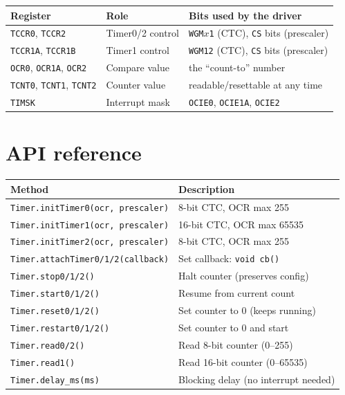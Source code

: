 \documentclass[11pt,a4paper]{article}
\begin{document}
\begin{center}
\small
\begin{tabular}{lll}
\toprule
\textbf{Register} & \textbf{Role} & \textbf{Bits used by the driver} \\
\midrule
\texttt{TCCR0}, \texttt{TCCR2}   & Timer0/2 control & \texttt{WGM$x$1} (CTC), \texttt{CS} bits (prescaler) \\
\texttt{TCCR1A}, \texttt{TCCR1B} & Timer1 control   & \texttt{WGM12} (CTC), \texttt{CS} bits (prescaler) \\
\texttt{OCR0}, \texttt{OCR1A}, \texttt{OCR2} & Compare value & the ``count-to'' number \\
\texttt{TCNT0}, \texttt{TCNT1}, \texttt{TCNT2} & Counter value & readable/resettable at any time \\
\texttt{TIMSK} & Interrupt mask & \texttt{OCIE0}, \texttt{OCIE1A}, \texttt{OCIE2} \\
\bottomrule
\end{tabular}
\end{center}

\section{API reference}

\begin{center}
\small
\begin{tabular}{ll}
\toprule
\textbf{Method} & \textbf{Description} \\
\midrule
\texttt{Timer.initTimer0(ocr, prescaler)} & 8-bit CTC, OCR max 255 \\
\texttt{Timer.initTimer1(ocr, prescaler)} & 16-bit CTC, OCR max 65535 \\
\texttt{Timer.initTimer2(ocr, prescaler)} & 8-bit CTC, OCR max 255 \\
\texttt{Timer.attachTimer0/1/2(callback)} & Set callback: \texttt{void cb()} \\
\texttt{Timer.stop0/1/2()} & Halt counter (preserves config) \\
\texttt{Timer.start0/1/2()} & Resume from current count \\
\texttt{Timer.reset0/1/2()} & Set counter to 0 (keeps running) \\
\texttt{Timer.restart0/1/2()} & Set counter to 0 and start \\
\texttt{Timer.read0/2()} & Read 8-bit counter (0--255) \\
\texttt{Timer.read1()} & Read 16-bit counter (0--65535) \\
\texttt{Timer.delay\_ms(ms)} & Blocking delay (no interrupt needed) \\
\bottomrule
\end{tabular}
\end{center}
\end{document}
